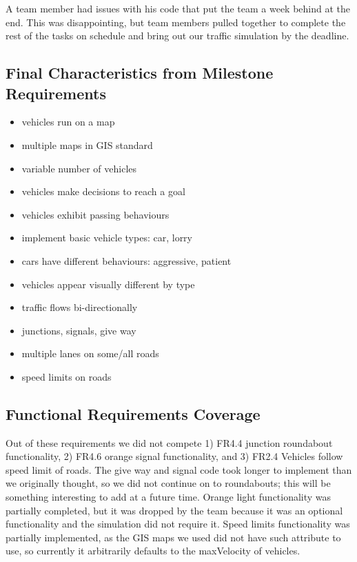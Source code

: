 \documentclass[11pt]{article}
\begin{document}
\begin{enumerate}
A team member had issues with his code that put the team a week behind at the end. This was disappointing, but team members pulled together to complete the rest of the tasks on schedule and bring out our traffic simulation by the deadline.
\\

\subsection{Final Characteristics from Milestone Requirements}
\begin{itemize}
\item vehicles run on a map
\item multiple maps in GIS standard
\item variable number of vehicles
\item vehicles make decisions to reach a goal
\item vehicles exhibit passing behaviours 
\item implement basic vehicle types: car, lorry
\item cars have different behaviours: aggressive, patient
\item vehicles appear visually different by type
\item traffic flows bi-directionally
\item junctions, signals, give way 
\item multiple lanes on some/all roads
\item speed limits on roads
\end{itemize}



\subsection{Functional Requirements Coverage}

Out of these requirements we did not compete 1) FR4.4 junction roundabout functionality, 2) FR4.6 orange signal functionality, and 3) FR2.4 Vehicles follow speed limit of roads. The give way and signal code took longer to implement than we originally thought, so we did not continue on to roundabouts; this will be something interesting to add at a future time. Orange light functionality was partially completed, but it was dropped by the team because it was an optional functionality and the simulation did not require it. Speed limits functionality was partially implemented, as the GIS maps we used did not have such attribute to use, so currently it arbitrarily defaults to the maxVelocity of vehicles.


\end{enumerate}
\end{document}
